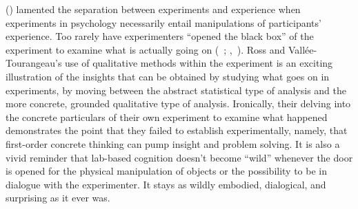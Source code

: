 \documentclass[twocolumn, issue, reflection, authordate]{jote-new-article}
\begin{document}
 (\citeyear{Moscovici1991}) lamented the separation between experiments and
experience when experiments in psychology necessarily entail
manipulations of participants' experience. Too rarely have experimenters
``opened the black box'' of the experiment to examine what is actually
going on (~\citeyear{Corti2015}; ,~\citeyear{Psaltis2007}). Ross and
Vallée-Tourangeau's use of qualitative methods within the experiment is
an exciting illustration of the insights that can be obtained by
studying what goes on in experiments, by moving between the abstract
statistical type of analysis and the more concrete, grounded qualitative
type of analysis. Ironically, their delving into the concrete
particulars of their own experiment to examine what happened
demonstrates the point that they failed to establish experimentally,
namely, that first-order concrete thinking can pump insight and problem
solving. It is also a vivid reminder that lab-based cognition doesn't
become ``wild'' whenever the door is opened for the physical
manipulation of objects or the possibility to be in dialogue with the
experimenter. It stays as wildly embodied, dialogical, and surprising as
it ever was.


\nocite{*}
\printbibliography
\end{document}

